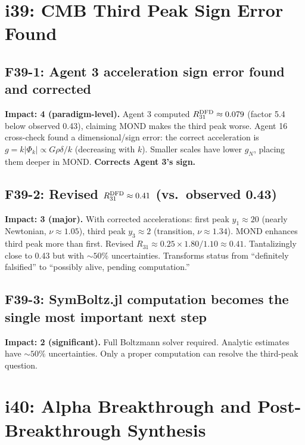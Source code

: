 \documentclass[11pt,a4paper]{article}
\begin{document}
\section{i39: CMB Third Peak Sign Error Found}
\label{sec:i39}

\subsection{F39-1: Agent 3 acceleration sign error found and corrected}
\textbf{Impact: 4 (paradigm-level).} Agent 3 computed $R_{31}^{\rm DFD} \approx 0.079$ (factor 5.4 below observed 0.43), claiming MOND makes the third peak worse. Agent 16 cross-check found a dimensional/sign error: the correct acceleration is $g = k|\Phi_k| \propto G\rho\delta/k$ (decreasing with $k$). Smaller scales have lower $g_N$, placing them deeper in MOND. \textbf{Corrects Agent 3's sign.}

\subsection{F39-2: Revised $R_{31}^{\rm DFD} \approx 0.41$ (vs.\ observed 0.43)}
\textbf{Impact: 3 (major).} With corrected accelerations: first peak $y_1 \approx 20$ (nearly Newtonian, $\nu \approx 1.05$), third peak $y_3 \approx 2$ (transition, $\nu \approx 1.34$). MOND enhances third peak more than first. Revised $R_{31} \approx 0.25 \times 1.80/1.10 \approx 0.41$. Tantalizingly close to 0.43 but with $\sim 50\%$ uncertainties. Transforms status from ``definitely falsified'' to ``possibly alive, pending computation.''

\subsection{F39-3: SymBoltz.jl computation becomes the single most important next step}
\textbf{Impact: 2 (significant).} Full Boltzmann solver required. Analytic estimates have $\sim 50\%$ uncertainties. Only a proper computation can resolve the third-peak question.

\section{i40: Alpha Breakthrough and Post-Breakthrough Synthesis}
\label{sec:i40}
\end{document}
